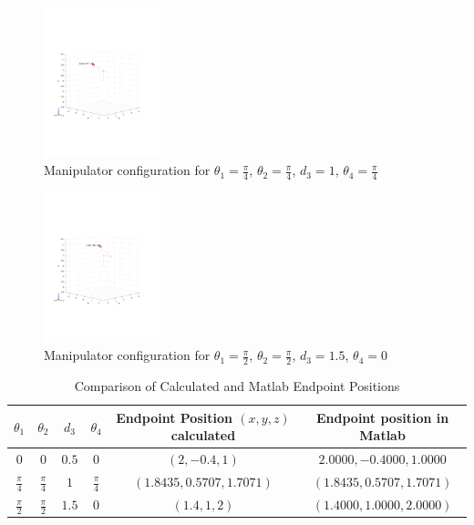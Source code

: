 \documentclass{article}
\begin{document}
\begin{figure}[h!]
  \centering
  \includegraphics[width=0.3\textwidth]{configuration_2.pdf}
  \caption{Manipulator configuration for $\theta_1 = \frac{\pi}{4}$, $\theta_2 = \frac{\pi}{4}$, $d_3 = 1$, $\theta_4 = \frac{\pi}{4}$}
  \label{fig:configuration_2}
\end{figure}

\begin{figure}[h!]
  \centering
  \includegraphics[width=0.3\textwidth]{configuration_3.pdf}
  \caption{Manipulator configuration for $\theta_1 = \frac{\pi}{2}$, $\theta_2 = \frac{\pi}{2}$, $d_3 = 1.5$, $\theta_4 = 0$}
  \label{fig:configuration_3}
\end{figure}

\begin{table}[h!]
  \centering
  \begin{tabular}{|c|c|c|c|c|c|}
  \hline
  $\theta_1$ & $\theta_2$ & $d_3$ & $\theta_4$ & Endpoint Position $(x, y, z)$ calculated & Endpoint position in Matlab \\
  \hline
  $0$ & $0$ & $0.5$ & 0 & $(2, -0.4, 1)$ & $2.0000, -0.4000, 1.0000$\\
  $\frac{\pi}{4}$ & $\frac{\pi}{4}$ & $1$ & $\frac{\pi}{4}$ & $(1.8435, 0.5707, 1.7071)$ & $(1.8435, 0.5707, 1.7071)$\\
  $\frac{\pi}{2}$ & $\frac{\pi}{2}$ & $1.5$ & $0$ & $(1.4, 1, 2)$ & $(1.4000, 1.0000, 2.0000)$ \\
  \hline
  \end{tabular}
  \caption{Comparison of Calculated and Matlab Endpoint Positions}
  \label{tab:endpoint_positions}
\end{table}
\end{document}

